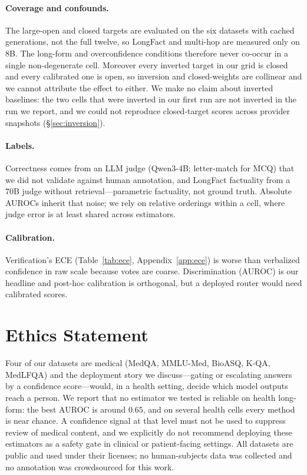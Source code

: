 \documentclass[11pt]{article}
\begin{document}
\paragraph{Coverage and confounds.} The large-open and closed targets are evaluated on the six
datasets with cached generations, not the full twelve, so LongFact and multi-hop are measured
only on 8B. The long-form and overconfidence conditions therefore never co-occur in a single
non-degenerate cell. Moreover every inverted target in our grid is closed and every calibrated
one is open, so inversion and closed-weights are collinear and we cannot attribute the effect to
either. We make no claim about inverted baselines: the two cells that were inverted in our first run are
not inverted in the run we report, and we could not reproduce closed-target scores across
provider snapshots (\S\ref{sec:inversion}).

\paragraph{Labels.} Correctness comes from an LLM judge (Qwen3-4B; letter-match for MCQ) that we
did not validate against human annotation, and LongFact factuality from a 70B judge without
retrieval---parametric factuality, not ground truth. Absolute AUROCs inherit that noise; we rely
on relative orderings within a cell, where judge error is at least shared across estimators.

\paragraph{Calibration.} Verification's ECE (Table~\ref{tab:ece}, Appendix~\ref{app:ece}) is worse than verbalized
confidence in raw scale because votes are coarse. Discrimination (AUROC) is our headline and
post-hoc calibration is orthogonal, but a deployed router would need calibrated scores.

\section*{Ethics Statement}
Four of our datasets are medical (MedQA, MMLU-Med, BioASQ, K-QA, MedLFQA) and the deployment
story we discuss---gating or escalating answers by a confidence score---would, in a health
setting, decide which model outputs reach a person. We report that no estimator we tested is
reliable on health long-form: the best AUROC is around $0.65$, and on several health cells every
method is near chance. A confidence signal at that level must not be used to suppress review of
medical content, and we explicitly do not recommend deploying these estimators as a safety gate
in clinical or patient-facing settings. All datasets are public and used under their licenses;
no human-subjects data was collected and no annotation was crowdsourced for this work.
\end{document}
